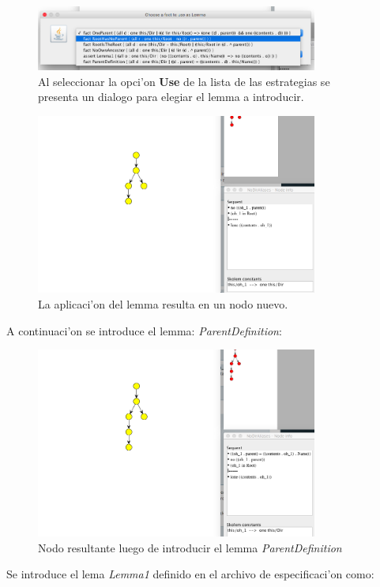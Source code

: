 \begin{figure}[H]
	\includegraphics[width=350px]{img/ejemplo/9.png}
	\centering
	\caption{Al seleccionar la opci'on \textbf{Use} de la lista de las estrategias se presenta un dialogo para elegiar el lemma a introducir.}
\end{figure}

\begin{figure}[H]
	\includegraphics[width=350px]{img/ejemplo/10.png}
	\centering
	\caption{La aplicaci'on del lemma resulta en un nodo nuevo.}
\end{figure}

A continuaci'on se introduce el lemma: \textit{ParentDefinition}:

\begin{figure}[H]
	\includegraphics[width=350px]{img/ejemplo/12.png}
	\centering
	\caption{Nodo resultante luego de introducir el lemma \textit{ParentDefinition}}
\end{figure}

Se introduce el lema \textit{Lemma1} definido en el archivo de especificaci'on como:

